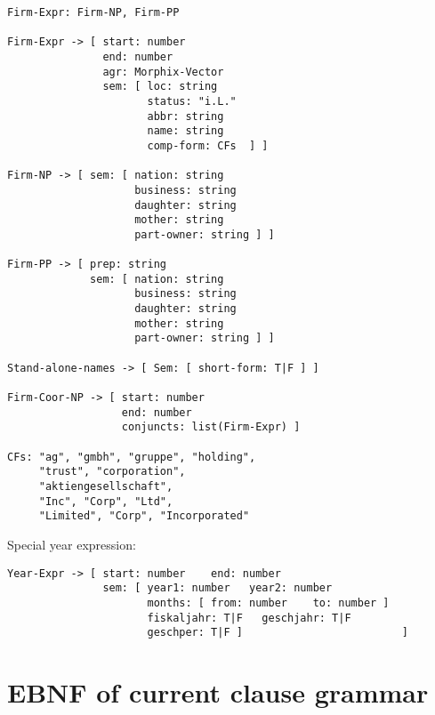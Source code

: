 \begin{verbatim}
Firm-Expr: Firm-NP, Firm-PP

Firm-Expr -> [ start: number    
               end: number    
               agr: Morphix-Vector
               sem: [ loc: string   
                      status: "i.L."   
                      abbr: string
                      name: string  
                      comp-form: CFs  ] ]

Firm-NP -> [ sem: [ nation: string   
                    business: string   
                    daughter: string
                    mother: string   
                    part-owner: string ] ]

Firm-PP -> [ prep: string
             sem: [ nation: string   
                    business: string   
                    daughter: string
                    mother: string      
                    part-owner: string ] ]

Stand-alone-names -> [ Sem: [ short-form: T|F ] ]

Firm-Coor-NP -> [ start: number   
                  end: number
                  conjuncts: list(Firm-Expr) ]

CFs: "ag", "gmbh", "gruppe", "holding", 
     "trust", "corporation",
     "aktiengesellschaft", 
     "Inc", "Corp", "Ltd", 
     "Limited", "Corp", "Incorporated"
\end{verbatim}

Special year expression:

\begin{verbatim}
Year-Expr -> [ start: number    end: number    
               sem: [ year1: number   year2: number
                      months: [ from: number    to: number ]
                      fiskaljahr: T|F   geschjahr: T|F
                      geschper: T|F ]                         ]
\end{verbatim}



\section{EBNF of current clause grammar}
\label{clause}

